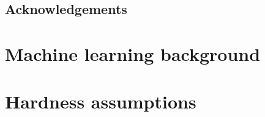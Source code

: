 \documentclass[
10pt,
aps,
pra,
linenumbers,
floatfix,
]{revtex4-2}
\theoremstyle{plain}
\theoremstyle{definition}
\begin{document}
\subsection*{Acknowledgements}



%


\onecolumngrid
\appendix

\section{Machine learning background}
\section{Hardness assumptions}

\end{document}
